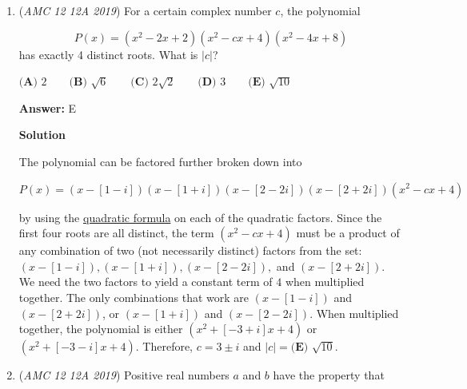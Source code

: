 \begin{enumerate}
 Adding up gives $216+216=\boxed{\textbf{(E) }432}$.

 



\textbf{Solution 3}

$2,4,8$ require different colors each, so there are $6$ ways to color these.

 $5$ and $7$ can be any color, so there are $3\times 3$ ways to color these.

 $6$ can have $2$ colors once $2$ is colored, and thus $3$ also has $2$ colors following $6$, which leaves another $2$ for $9$.

 All together: $6\times 3 \times 3 \times 2 \times 2 \times 2 = 432 \Rightarrow \boxed{E}$.

 


	\item (\textit{AMC 12 12A 2019}) For a certain complex number $c$, the polynomial

 \[P(x) = (x^2 - 2x + 2)(x^2 - cx + 4)(x^2 - 4x + 8)\]has exactly 4 distinct roots. What is $|c|$?


 $\textbf{(A) } 2 \qquad \textbf{(B) } \sqrt{6} \qquad \textbf{(C) } 2\sqrt{2} \qquad \textbf{(D) } 3 \qquad \textbf{(E) } \sqrt{10}$

 \textbf{Answer: }E



\textbf{Solution}

The polynomial can be factored further broken down into

 $P(x) = (x - [1 - i])(x - [1 + i])(x - [2 - 2i])(x - [2 + 2i])(x^2 - cx + 4)$

 by using the \href{https://artofproblemsolving.com/wiki/index.php?title=Quadratic\_formula}{quadratic formula} on each of the quadratic factors. Since the first four roots are all distinct, the term $(x^2 - cx + 4)$ must be a product of any combination of two (not necessarily distinct) factors from the set: $(x - [1 - i]), (x - [1 + i]), (x - [2 - 2i]),$ and $(x - [2 + 2i])$. We need the two factors to yield a constant term of $4$ when multiplied together. The only combinations that work are $(x - [1 - i])$ and $(x - [2 + 2i])$, or $(x - [1+i])$ and $(x - [2-2i])$. When multiplied together, the polynomial is either $(x^2 + [-3 + i]x + 4)$ or $(x^2+[-3-i]x+4)$. Therefore, $c = 3 \pm i$ and $|c| = \boxed{\textbf{(E) } \sqrt{10}}$.

 


	\item (\textit{AMC 12 12A 2019}) Positive real numbers $a$ and $b$ have the property that


\end{enumerate}
